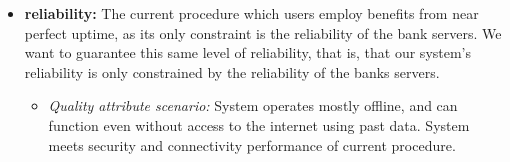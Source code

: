 \documentclass[11pt]{article}
\newcounter{use case ID}
\newcounter{req ID}
\begin{document}
\begin{itemize}
     \item \textbf{reliability:} The current procedure which users employ benefits from near perfect uptime, as its only constraint is the reliability of the bank servers. We want to guarantee this same level of reliability, that is, that our system's reliability is only constrained by the reliability of the banks servers.
    \begin{itemize}
        \item \textit{Quality attribute scenario:} System operates mostly offline, and can function even without access to the internet using past data. System meets security and connectivity performance of current procedure.
     \end{itemize}


\end{itemize}
\end{document}
